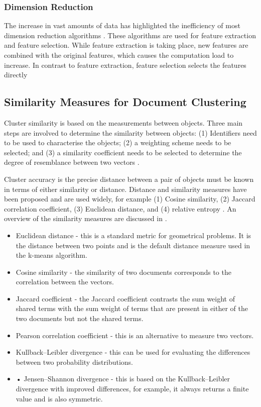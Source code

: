 \subsubsection{Dimension Reduction}

The increase in vast amounts of data has highlighted the inefficiency of most dimension reduction algorithms \cite{mugunthadevi2011survey}. These algorithms are used for feature extraction and feature selection. While feature extraction is taking place, new features are combined with the original features, which causes the computation load to increase. In contrast to feature extraction, feature selection selects the features directly

\subsection{Similarity Measures for Document Clustering} \label{JSD}

Cluster similarity is  based on the measurements between objects. Three main steps are involved to determine the similarity between objects: (1) Identifiers need to be used to characterise the objects; (2) a weighting scheme needs to be selected; and (3) a similarity coefficient needs to be selected to determine the degree of resemblance between two vectors \cite{willett1988recent}.

Cluster accuracy is the precise distance between a pair of objects must be known  in terms of either similarity or distance. Distance and similarity measures have been proposed and are used widely, for example  (1) Cosine similarity, (2) Jaccard correlation coefficient, (3) Euclidean distance, and (4) relative entropy \cite{huang2008similarity}. An overview of the similarity measures are discussed in .

\begin{itemize}
    \item Euclidean distance - this is a standard metric for geometrical problems. It is the distance between two points and is the default distance measure used in the k-means algorithm.
    \item Cosine similarity - the similarity of two documents corresponds to the correlation between the vectors.
    \item Jaccard coefficient - the Jaccard coefficient contrasts the sum weight of shared terms with the sum weight of terms that are present in either of the two documents but not the shared terms.
    \item Pearson correlation coefficient - this is an alternative to measure two vectors.
    \item Kullback–Leibler divergence - this can be used for evaluating the differences between two probability distributions.
    \item •	Jensen–Shannon divergence - this is based on the Kullback–Leibler divergence with improved differences, for example, it always returns a finite value and is also symmetric.
\end{itemize}

